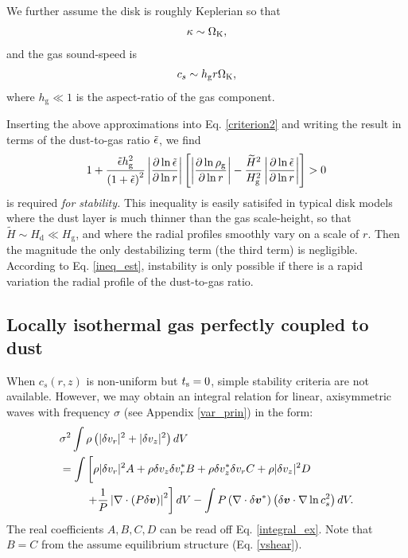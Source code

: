 We further assume
the disk is roughly Keplerian so that
\begin{align}
  \kappa \sim \Omega_{\rm K}, 
\end{align}
and the gas sound-speed is 
\begin{align}
  c_s \sim h_\mathrm{g}r\Omega_{\rm K}, 
\end{align}
where $h_\mathrm{g}\ll1$ is the aspect-ratio of the gas component. 

Inserting the above approximations into Eq. \ref{criterion2} and writing the result in terms of the
dust-to-gas ratio $\tilde{\epsilon}$,           
we find 
\begin{align}\label{ineq_est}
  1 + \frac{\tilde{\epsilon} h_\mathrm{g}^2}{\left(1 + \tilde{\epsilon}\right)^2}
  \left|\frac{\partial\ln{\tilde{\epsilon}}}{\partial\ln{r}}\right| 
  \left[
    \left|\frac{\partial\ln{\rho_\mathrm{g}}}{\partial\ln{r}}\right| - \frac{\widetilde{H}^2}{H^2_\mathrm{g}}\left|\frac{\partial\ln{\tilde{\epsilon}}}{\partial\ln{r}}\right|  
    \right]>0
\end{align}
is required \emph{for stability.} 
This inequality is easily satisifed in typical disk models where 
the dust layer is much thinner than the gas scale-height, so
that $\widetilde{H}\sim H_\mathrm{d}\ll H_\mathrm{g}$, and where the radial profiles smoothly vary on a scale of $r$.
Then the magnitude the only destabilizing term (the third term) is negligible. According to Eq. \ref{ineq_est}, instability is only possible if there is a rapid variation the radial profile of the dust-to-gas ratio.   


\subsection{Locally isothermal gas perfectly coupled to dust} 
When $c_s(r,z)$ is non-uniform but $t_\mathrm{s}=0$, simple stability
criteria are not available. However, we may obtain an integral
relation for linear, axisymmetric waves with frequency $\sigma$ (see
Appendix \ref{var_prin}) in the form:  
\begin{align}
&  \sigma^2\int\rho\left(|\dd v_r|^2 + |\dd v_z|^2\right)dV \notag\\
&= \int\left[ \rho
  |\dd v_r|^2A + \rho  \dd v_z \dd v_r^* B + \rho \dd v_z^*\dd v_r C +
  \rho |\dd v_z|^2 D\phantom{\frac{1}{1}}\right. \notag\\
&\phantom{===}  \left. + \frac{1}{P}\left|\nabla\cdot\left(P\dd
  \bm{v}\right)\right|^2\right]dV - \int P
  \left(\nabla\cdot\dd\bm{v}^*\right)\left(\dd\bm{v}\cdot\nabla\ln{c_s^2}\right)dV.
\end{align}
The real coefficients $A,B,C,D$ can be read off
Eq. \ref{integral_ex}. Note that $B=C$ from the assume equilibrium
structure (Eq. \ref{vshear}).  

